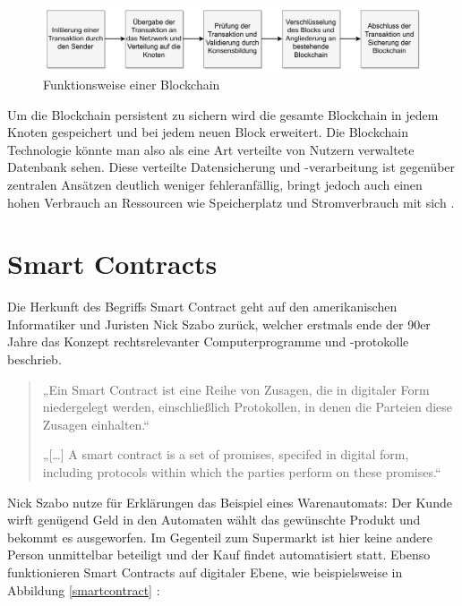     \begin{figure}
        \includegraphics[width=15.8cm]{Bilder/Blockchain_schema.pdf}
        \centering
        \caption{Funktionsweise einer Blockchain}
    \end{figure}

Um die Blockchain persistent zu sichern wird die gesamte Blockchain in jedem Knoten gespeichert und bei jedem neuen Block erweitert.
Die Blockchain Technologie könnte man also als eine Art verteilte von Nutzern verwaltete Datenbank sehen.
Diese verteilte Datensicherung und -verarbeitung ist gegenüber zentralen Ansätzen deutlich weniger fehleranfällig,
bringt jedoch auch einen hohen Verbrauch an Ressourcen wie Speicherplatz und Stromverbrauch mit sich \parencite[vgl.][314]{Neugebauer.2018}.

\section{Smart Contracts}

Die Herkunft des Begriffs Smart Contract geht auf den amerikanischen Informatiker und Juristen Nick Szabo zurück,
welcher erstmals ende der 90er Jahre das Konzept rechtsrelevanter Computerprogramme und -protokolle beschrieb.

    \begin{quote} 
        „Ein Smart Contract ist eine Reihe von Zusagen, die in digitaler Form niedergelegt werden, einschließlich Protokollen, in denen die Parteien diese Zusagen einhalten.“
        \parencite[3]{WILKENS.2019}

        „[…] A smart contract is a set of promises, specifed in digital form, including protocols within which the parties perform on these promises.“
        \parencite[]{.23.01.2006}
    \end{quote}

Nick Szabo nutze für Erklärungen das Beispiel eines Warenautomats: Der Kunde wirft genügend Geld in den Automaten wählt das gewünschte Produkt und bekommt es ausgeworfen.
Im Gegenteil zum Supermarkt ist hier keine andere Person unmittelbar beteiligt und der Kauf findet automatisiert statt.
Ebenso funktionieren Smart Contracts auf digitaler Ebene, wie beispielsweise in Abbildung \ref{smartcontract} \parencite[vgl.][618]{Kaulartz.2016}:

